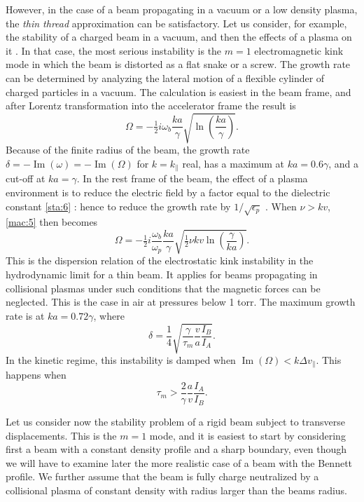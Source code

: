 \documentclass [12pt,a4paper,     ]{report} %
\newcommand{\IMA}{\operatorname{Im}}  %
\newcommand{\Oh}{\tfrac{1}{2}}        %
\begin{document}
	However, in the case of a beam propagating in a vacuum or a low density plasma, the \emph{thin thread} approximation can be satisfactory.  Let us consider, for example, the stability of a charged beam in a vacuum, and then the effects of a plasma on it \cite{JORNA1978-}.  In that case, the most serious instability is the $m=1$ electromagnetic kink mode in which the beam is distorted as a flat snake or a screw.  The growth rate can be determined by analyzing the lateral motion of a flexible cylinder of charged particles in a vacuum.  The calculation is easiest in the beam frame, and after Lorentz transformation into the accelerator frame the result is
%
\begin{equation}\label{mac:5} %
  \Omega = -\Oh i \omega_b \frac{ka}{\gamma} \sqrt{\ln (\frac{ka}{\gamma}) }.
\end{equation}
%
Because of the finite radius of the beam, the growth rate $\delta = -\IMA(\omega) = -\IMA(\Omega)$  for $k=k_{\|}$ real, has a maximum at $ka = 0.6\gamma$, and a cut-off at $ka = \gamma$.  In the rest frame of the beam, the effect of a plasma environment is to reduce the electric field by a factor equal to the dielectric constant \eqref{sta:6} : hence to reduce the growth rate by $1/\sqrt{\epsilon_p}$ .  When $\nu > kv$, \eqref{mac:5} then becomes
%
\begin{equation}\label{mac:6} %
    \Omega = -\Oh i \frac{\omega_b}{\omega_p} \frac{ka}{\gamma}
                  \sqrt{\Oh \nu k v \ln (\frac{\gamma}{ka}) }.
\end{equation}
%
This is the dispersion relation of the electrostatic kink instability in the hydrodynamic limit for a thin beam.  It applies for beams propagating in collisional plasmas under such conditions that the magnetic forces can be neglected.  This is the case in air at pressures below 1 torr.  The maximum growth rate is at $ka = 0.72 \gamma$, where
%
\begin{equation}\label{mac:7} %
\delta = \frac{1}{4}\sqrt{\frac{\gamma}{\tau_m} \frac{v}{a} \frac{I_B}{I_A}}.
\end{equation}
%
In the kinetic regime, this instability is damped when  $\IMA(\Omega) < k \Delta v_{\|}$.  This happens when
%
\begin{equation}\label{mac:8} %
   \tau_m  >  \frac{2}{\gamma} \frac{a}{v} \frac{I_A}{I_B}.
\end{equation}
%

	Let us consider now the stability problem of a rigid beam subject to transverse displacements.  This is the $m=1$ mode, and it is easiest to start by considering first a beam with a constant density profile and a sharp boundary, even though we will have to examine later the more realistic case of a beam with the Bennett profile.  We further assume that the beam is fully charge neutralized by a collisional plasma of constant density with radius larger than the beams radius.
\end{document}
